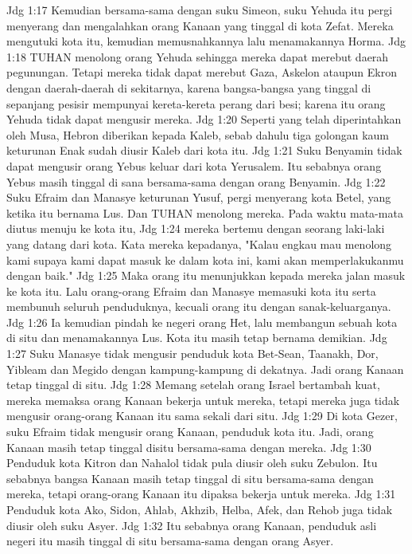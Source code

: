 Jdg 1:17  Kemudian bersama-sama dengan suku Simeon, suku Yehuda itu pergi menyerang dan mengalahkan orang Kanaan yang tinggal di kota Zefat. Mereka mengutuki kota itu, kemudian memusnahkannya lalu menamakannya Horma.
Jdg 1:18  TUHAN menolong orang Yehuda sehingga mereka dapat merebut daerah pegunungan. Tetapi mereka tidak dapat merebut Gaza, Askelon ataupun Ekron dengan daerah-daerah di sekitarnya, karena bangsa-bangsa yang tinggal di sepanjang pesisir mempunyai kereta-kereta perang dari besi; karena itu orang Yehuda tidak dapat mengusir mereka.
Jdg 1:20  Seperti yang telah diperintahkan oleh Musa, Hebron diberikan kepada Kaleb, sebab dahulu tiga golongan kaum keturunan Enak sudah diusir Kaleb dari kota itu.
Jdg 1:21  Suku Benyamin tidak dapat mengusir orang Yebus keluar dari kota Yerusalem. Itu sebabnya orang Yebus masih tinggal di sana bersama-sama dengan orang Benyamin.
Jdg 1:22  Suku Efraim dan Manasye keturunan Yusuf, pergi menyerang kota Betel, yang ketika itu bernama Lus. Dan TUHAN menolong mereka. Pada waktu mata-mata diutus menuju ke kota itu,
Jdg 1:24  mereka bertemu dengan seorang laki-laki yang datang dari kota. Kata mereka kepadanya, "Kalau engkau mau menolong kami supaya kami dapat masuk ke dalam kota ini, kami akan memperlakukanmu dengan baik."
Jdg 1:25  Maka orang itu menunjukkan kepada mereka jalan masuk ke kota itu. Lalu orang-orang Efraim dan Manasye memasuki kota itu serta membunuh seluruh penduduknya, kecuali orang itu dengan sanak-keluarganya.
Jdg 1:26  Ia kemudian pindah ke negeri orang Het, lalu membangun sebuah kota di situ dan menamakannya Lus. Kota itu masih tetap bernama demikian.
Jdg 1:27  Suku Manasye tidak mengusir penduduk kota Bet-Sean, Taanakh, Dor, Yibleam dan Megido dengan kampung-kampung di dekatnya. Jadi orang Kanaan tetap tinggal di situ.
Jdg 1:28  Memang setelah orang Israel bertambah kuat, mereka memaksa orang Kanaan bekerja untuk mereka, tetapi mereka juga tidak mengusir orang-orang Kanaan itu sama sekali dari situ.
Jdg 1:29  Di kota Gezer, suku Efraim tidak mengusir orang Kanaan, penduduk kota itu. Jadi, orang Kanaan masih tetap tinggal disitu bersama-sama dengan mereka.
Jdg 1:30  Penduduk kota Kitron dan Nahalol tidak pula diusir oleh suku Zebulon. Itu sebabnya bangsa Kanaan masih tetap tinggal di situ bersama-sama dengan mereka, tetapi orang-orang Kanaan itu dipaksa bekerja untuk mereka.
Jdg 1:31  Penduduk kota Ako, Sidon, Ahlab, Akhzib, Helba, Afek, dan Rehob juga tidak diusir oleh suku Asyer.
Jdg 1:32  Itu sebabnya orang Kanaan, penduduk asli negeri itu masih tinggal di situ bersama-sama dengan orang Asyer.

